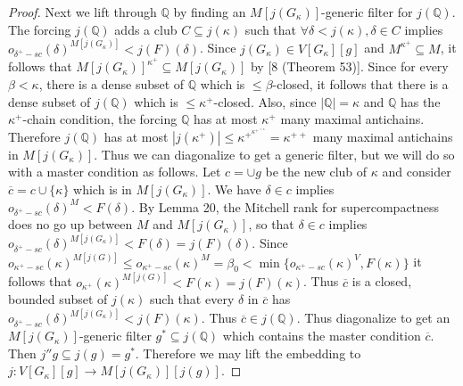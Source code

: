 \documentclass[10pt,leqno]{amsart}
\begin{document}
\begin{proof}
Next we lift through $\mathbb{Q}$ by finding an $M[j(G_{\kappa})]$-generic filter for $j(\mathbb{Q})$. The forcing $j(\mathbb{Q})$ adds a club $C \subseteq j(\kappa)$ such that $\forall \delta < j(\kappa), \delta \in C$ implies $o_{\delta^+-sc}(\delta)^{M[j(G_{\kappa})]} < j(F)(\delta)$. Since $j(G_{\kappa}) \in V[G_{\kappa}][g]$ and $M^{\kappa^+} \subseteq M$, it follows that $M[j(G_{\kappa})]^{\kappa^+} \subseteq M[j(G_{\kappa})]$ by [8 (Theorem 53)]. Since for every $\beta < \kappa$, there is a dense subset of $\mathbb{Q}$ which is $\le \beta$-closed, it follows that there is a dense subset of $j(\mathbb{Q})$ which is $\le \kappa^+$-closed. Also, since $|\mathbb{Q}| = \kappa$ and $\mathbb{Q}$ has the $\kappa^+$-chain condition, the forcing $\mathbb{Q}$ has at most $\kappa^+$ many maximal antichains. Therefore $j(\mathbb{Q})$ has at most $|j(\kappa^+)| \le \kappa^{+^{\kappa^{+^{< \kappa}}}} = \kappa^{++}$ many maximal antichains in $M[j(G_{\kappa})]$. Thus we can diagonalize to get a generic filter, but we will do so with a master condition as follows. Let $c = \cup g$ be the new club of $\kappa$ and consider $\overline{c} = c \cup \{\kappa\}$ which is in $M[j(G_{\kappa})]$. We have $\delta \in c$ implies $o_{\delta^+-sc}(\delta)^M < F(\delta)$. By Lemma 20, the Mitchell rank for supercompactness does no go up between $M$ and $M[j(G_{\kappa})]$, so that $\delta \in c$ implies $o_{\delta^+-sc}(\delta)^{M[j(G_{\kappa})]} < F(\delta) = j(F)(\delta)$. Since $o_{\kappa^+-sc}(\kappa)^{M[j(G)]}\le o_{\kappa^+-sc}(\kappa)^M = \beta_0 < \min\{o_{\kappa^+-sc}(\kappa)^V, F(\kappa)\}$ it follows that $o_{\kappa^+}(\kappa)^{M[j(G)]} < F(\kappa) = j(F)(\kappa)$. Thus $\overline{c}$  is a closed, bounded subset of $j(\kappa)$ such that every $\delta$ in $\overline{c}$ has $o_{\delta^+-sc}(\delta)^{M[j(G_{\kappa})]} < j(F)(\kappa)$. Thus $\overline{c} \in j(\mathbb{Q})$. Thus diagonalize to get an $M[j(G_{\kappa})]$-generic filter $g^* \subseteq j(\mathbb{Q})$ which contains the master condition $\overline{c}$. Then $j''g \subseteq j(g) = g^*$. Therefore we may lift the embedding to $j:V[G_{\kappa}][g] \to M[j(G_{\kappa})][j(g)]$.


\end{proof}
\end{document}
